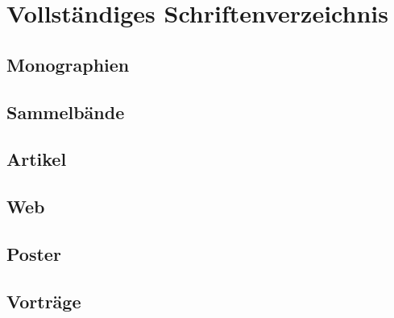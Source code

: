 \documentclass[a4paper,10pt]{book}
\author{Sebastian Nordhoff}
\begin{document}
\chapter*{Vollständiges Schriftenverzeichnis}
\section{Monographien}
\noindent


\section{Sammelbände}
\noindent


\section{Artikel}
\noindent


\section{Web}
\noindent

 
\section{Poster}


\section{Vorträge}
\noindent

\end{document}
